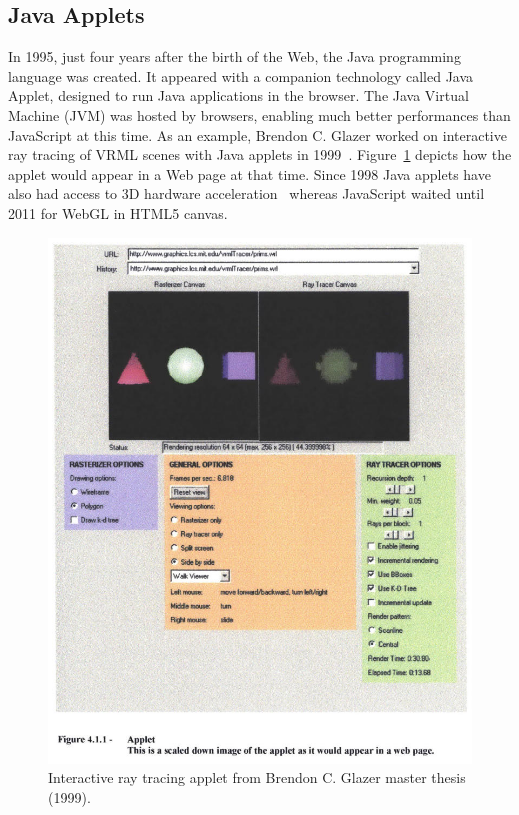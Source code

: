 \subsection{Java Applets}%
\label{sub:java_applets}

In 1995, just four years after the birth of the Web,
the Java programming language was created.
It appeared with a companion technology called Java Applet,
designed to run Java applications in the browser.
The Java Virtual Machine (JVM) was hosted by browsers,
enabling much better performances than JavaScript at this time.
As an example, Brendon C. Glazer worked on interactive ray tracing
of VRML scenes with Java applets in 1999~\cite{Glazer1999InteractiveRT}.
Figure~\ref{fig:glazer-thesis} depicts how the applet would appear
in a Web page at that time.
Since 1998 Java applets have also had access to 3D hardware acceleration~\cite{Java3dAPISpec}
whereas JavaScript waited until 2011 for WebGL in HTML5 canvas.

\begin{figure}[h!]
	\centering
	\includegraphics[width=\linewidth]{assets/img/glazer-thesis.jpg}
	\caption{Interactive ray tracing applet from Brendon C. Glazer master thesis (1999).}%
	\label{fig:glazer-thesis}
\end{figure}

